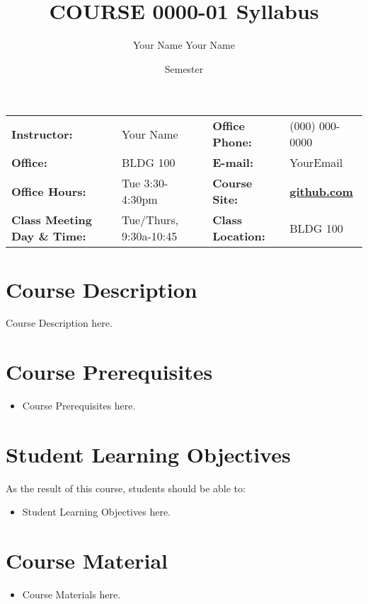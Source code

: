 \documentclass[article,letterpaper,times,10pt,listings-bw,microtype]{scrartcl}
\author{Your Name Your Name}
\date{Semester}
\title{COURSE 0000-01 Syllabus}
\begin{document}

\begin{center}
{}
\end{center}

\begin{center}
{}
\end{center}

\vspace{5 mm}

\begin{center}
\begin{tabular}{llll}
\textbf{Instructor:} & Your Name & \textbf{Office Phone:} & (000) 000-0000\\
\textbf{Office:} & BLDG 100 & \textbf{E-mail:} & YourEmail\\
\textbf{Office Hours:} & Tue 3:30-4:30pm & \textbf{Course Site:} & \textbf{\href{https://github.com}{github.com}}\\
\textbf{Class Meeting Day \& Time:} & Tue/Thurs, 9:30a-10:45 & \textbf{Class Location:} & BLDG 100\\
\end{tabular}
\end{center}
\section*{Course Description}
\label{sec:orgd5d370c}
Course Description here.
\section*{Course Prerequisites}
\label{sec:org4f3be37}
\begin{itemize}
\item Course Prerequisites here.
\end{itemize}
\section*{Student Learning Objectives}
\label{sec:orgb011a5d}
As the result of this course, students should be able to:

\begin{itemize}
\item Student Learning Objectives here.
\end{itemize}
\section*{Course Material}
\label{sec:org9767fb3}
\begin{itemize}
\item Course Materials here.
\end{itemize}
\end{document}
